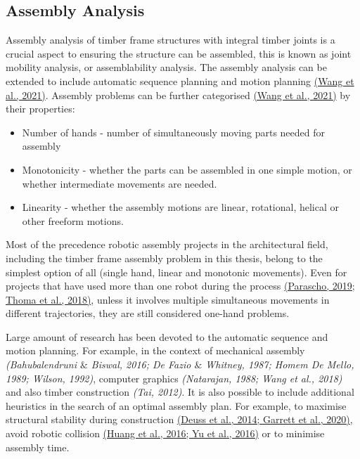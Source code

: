 \documentclass[11pt]{book}
\begin{document}
\subsection{Assembly Analysis}

Assembly analysis of timber frame structures with integral timber joints is a crucial aspect to ensuring the structure can be assembled, this is known as joint mobility analysis, or assemblability analysis. The assembly analysis can be extended to include automatic sequence planning and motion planning \href{https://www.zotero.org/google-docs/?JFbpMZ}{(Wang et al., 2021)}. Assembly problems can be further categorised \href{https://www.zotero.org/google-docs/?Ioe45z}{(Wang et al., 2021)} by their properties: 

\begin{itemize}
	\item Number of hands - number of simultaneously moving parts needed for assembly 

	\item Monotonicity - whether the parts can be assembled in one simple motion, or whether intermediate movements are needed.

	\item Linearity - whether the assembly motions are linear, rotational, helical or other freeform motions. 

\end{itemize}
Most of the precedence robotic assembly projects in the architectural field, including the timber frame assembly problem in this thesis, belong to the simplest option of all (single hand, linear and monotonic movements). Even for projects that have used more than one robot during the process \href{https://www.zotero.org/google-docs/?4QpBeT}{(Parascho, 2019; Thoma et al., 2018)}, unless it involves multiple simultaneous movements in different trajectories, they are still considered one-hand problems.

\begin{flushleft}
Large amount of research has been devoted to the automatic sequence and motion planning. For example, in the context of mechanical assembly\textit{ \href{https://www.zotero.org/google-docs/?AdSBUO}{}(Bahubalendruni $\&$ Biswal, 2016; De Fazio $\&$ Whitney, 1987; Homem De Mello, 1989; Wilson, 1992)}, computer graphics\textit{ \href{https://www.zotero.org/google-docs/?drprl1}{}(Natarajan, 1988; Wang et al., 2018)} and also timber construction\textit{ \href{https://www.zotero.org/google-docs/?NZFd5k}{}(Tai, 2012)}. It is also possible to include additional heuristics in the search of an optimal assembly plan. For example, to maximise structural stability during construction \href{https://www.zotero.org/google-docs/?qq9t2G}{(Deuss et al., 2014; Garrett et al., 2020)}, avoid robotic collision \href{https://www.zotero.org/google-docs/?noNjLm}{(Huang et al., 2016; Yu et al., 2016)} or to minimise assembly time.
\end{flushleft}
\end{document}
